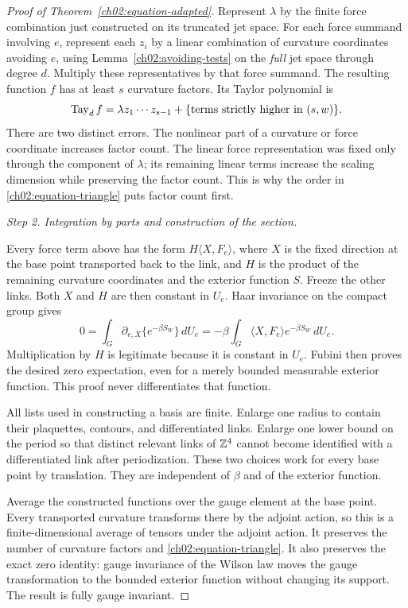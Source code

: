 \begin{proof}[Proof of Theorem~\ref{ch02:equation-adapted}]
Represent $\lambda$ by the finite force combination just constructed
on its truncated jet space. For each force summand involving $e$,
represent each $z_i$ by a linear combination of curvature coordinates
avoiding $e$, using Lemma~\ref{ch02:avoiding-tests} on the \emph{full}
jet space through degree $d$. Multiply these representatives by
that force summand. The resulting function $f$ has at least $s$
curvature factors. Its Taylor polynomial is
\begin{equation}
 \operatorname{Tay}_d f
   =\lambda z_1\cdots z_{s-1}
       +\{\hbox{terms strictly higher in }(s,w)\}.
 \label{ch02:equation-triangle}
\end{equation}
There are two distinct errors. The nonlinear part of a curvature
or force coordinate increases factor count. The linear force
representation was fixed only through the component of $\lambda$;
its remaining linear terms increase the scaling dimension while preserving the factor
count. This is why the order in
\eqref{ch02:equation-triangle} puts factor count first.

\smallskip\noindent\emph{Step 2. Integration by parts and construction of the section.}

Every force term above has the form
$H\langle X,F_e\rangle$, where $X$ is the fixed direction at the
base point transported back to the link, and $H$ is the product of the
remaining curvature coordinates and the exterior function $S$.
Freeze the other links. Both $X$ and $H$ are then constant in $U_e$. Haar invariance
on the compact group gives
\[
 0=\int_G\partial_{e,X}\{e^{-\beta S_W}\}\,dU_e
   =-\beta\int_G\langle X,F_e\rangle
                          e^{-\beta S_W}\,dU_e.
\]
Multiplication by $H$ is legitimate because it is constant in
$U_e$. Fubini then proves the desired zero expectation, even for a
merely bounded measurable exterior function. This proof never
differentiates that function.

All lists used in constructing a basis are finite. Enlarge one
radius to contain their plaquettes, contours, and differentiated links.
Enlarge one lower bound on the period so that distinct relevant links of $\mathbb Z^4$
cannot become identified with a differentiated link after
periodization. These two choices work for every base point by translation.
They are independent of $\beta$ and of the exterior function.

Average the constructed functions over the gauge element at the
base point. Every transported curvature transforms there by the adjoint
action, so this is a finite-dimensional average of tensors under the adjoint action.
It preserves the number of curvature factors and
\eqref{ch02:equation-triangle}. It also preserves the exact zero
identity: gauge invariance of the Wilson law moves the gauge
transformation to the bounded exterior function without changing
its support. The result is fully gauge invariant.


\end{proof}
